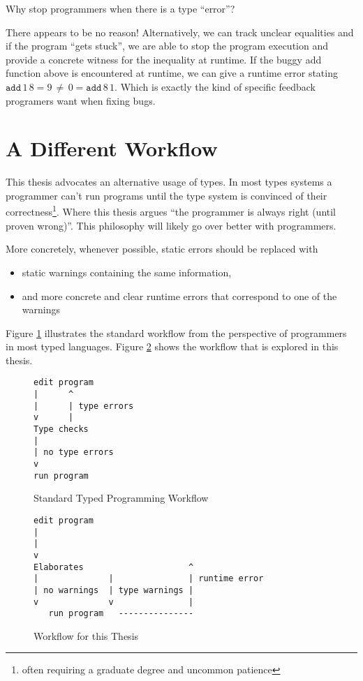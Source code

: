 Why stop programmers when there is a type ``error''? 

There appears to be no reason! Alternatively, we can track unclear equalities and if the program ``gets stuck'', we are able to stop the program execution and provide a concrete witness for the inequality at runtime.
If the buggy add function above is encountered at runtime, we can give a runtime error stating $\mathtt{add}\,1\,8=9\,\neq\,0=\mathtt{add}\,8\,1$.
Which is exactly the kind of specific feedback programers want when fixing bugs.

\section{A Different Workflow}

This thesis advocates an alternative usage of types. In most types systems a programmer can't run programs until the type system is convinced of their correctness\footnote{
 often requiring a graduate degree and uncommon patience}.
Where this thesis argues ``the programmer is always right (until proven wrong)''.
This philosophy will likely go over better with programmers.

More concretely, whenever possible, static errors should be replaced with
\begin{itemize}
\item static warnings containing the same information,
\item and more concrete and clear runtime errors that correspond to one of the warnings
\end{itemize}
Figure \ref{fig:intro-standard-workflow} illustrates the standard workflow from the perspective of programmers in most typed languages.
Figure \ref{fig:intro-thesis-workflow} shows the workflow that is explored in this thesis.

\begin{figure}
\begin{lstlisting}
edit program
|      ^
|      | type errors
v      |
Type checks
|
| no type errors
v
run program
\end{lstlisting}


\caption{Standard Typed Programming Workflow}
\label{fig:intro-standard-workflow}
\end{figure}

\begin{figure}
\begin{lstlisting}
edit program
|     
|     
v
Elaborates                     ^
|              |               | runtime error
| no warnings  | type warnings |
v              v               |
   run program   ---------------
\end{lstlisting}


\caption{Workflow for this Thesis}
\label{fig:intro-thesis-workflow}
\end{figure}

